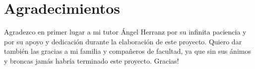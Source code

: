\chapter*{Agradecimientos}

Agradezco en primer lugar a mi tutor Ángel Herranz por su infinita
paciencia y por su apoyo y dedicación durante la elaboración de este
proyecto. Quiero dar también las gracias a mi familia y compañeros de
facultad, ya que sin sus ánimos y broncas jamás habría terminado este
proyecto. Gracias! 

